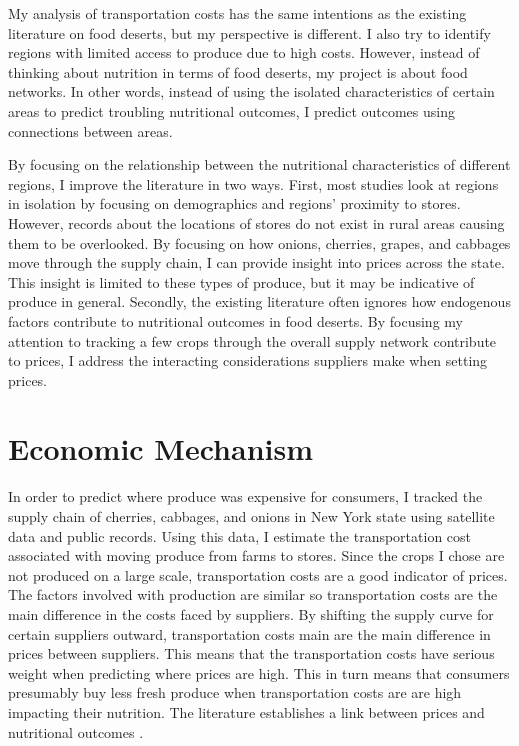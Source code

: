 \documentclass{report}
\begin{document}
My analysis of transportation costs has the same intentions as the existing literature on food deserts, but my perspective is different. I also try to identify regions with limited access to produce due to high costs. However, instead of thinking about nutrition in terms of food deserts, my project is about food networks. In other words, instead of using the isolated characteristics of certain areas to predict troubling nutritional outcomes, I predict outcomes using connections between areas. 

By focusing on the relationship between the nutritional characteristics of different regions, I improve the literature in two ways. First, most studies look at regions in isolation by focusing on demographics and regions' proximity to stores. However, records about the locations of stores do not exist in rural areas causing them to be overlooked. By focusing on how onions, cherries, grapes, and cabbages move through the supply chain, I can provide insight into prices across the state. This insight is limited to these types of produce, but it may be indicative of produce in general. Secondly, the existing literature often ignores how endogenous factors contribute to nutritional outcomes in food deserts. By focusing my attention to tracking a few crops through the overall supply network contribute to prices, I address the interacting considerations suppliers make when setting prices.

\section{Economic Mechanism}

In order to predict where produce was expensive for consumers, I tracked the supply chain of cherries, cabbages, and onions in New York state using satellite data and public records. Using this data, I estimate the transportation cost associated with moving produce from farms to stores. Since the crops I chose are not produced on a large scale, transportation costs are a good indicator of prices. The factors involved with production are similar so transportation costs are the main difference in the costs faced by suppliers. By shifting the supply curve for certain suppliers outward, transportation costs main are the main difference in prices between suppliers. This means that the transportation costs have serious weight when predicting where prices are high. This in turn means that consumers presumably buy less fresh produce when transportation costs are are high impacting their nutrition. The literature establishes a link between prices and nutritional outcomes \cite{Just}.
\end{document}
